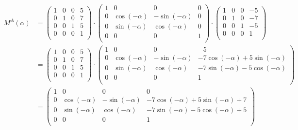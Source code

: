 \documentclass[a4paper,10pt,DIV=14]{article}
\begin{document}
\begin{align*}
M^A(\alpha) & = \begin{pmatrix}
					1 & 0 & 0 & 5 \\
					0 & 1 & 0 & 7 \\
					0 & 0 & 1 & 5 \\
					0 & 0 & 0 & 1 \\
				\end{pmatrix} \cdot
				\begin{pmatrix}
					1 & 0             & 0              & 0 \\
					0 & \cos(-\alpha) & -\sin(-\alpha) & 0 \\
					0 & \sin(-\alpha) & \cos(-\alpha)  & 0 \\
					0 & 0             & 0              & 1 \\
				\end{pmatrix} \cdot
				\begin{pmatrix}
					1 & 0 & 0 & -5 \\
					0 & 1 & 0 & -7 \\
					0 & 0 & 1 & -5 \\
					0 & 0 & 0 & 1  \\
				\end{pmatrix} \\
			& = \begin{pmatrix}
					1 & 0 & 0 & 5 \\
					0 & 1 & 0 & 7 \\
					0 & 0 & 1 & 5 \\
					0 & 0 & 0 & 1 \\
				\end{pmatrix} \cdot
				\begin{pmatrix}
					1 & 0             & 0              & -5                               \\
					0 & \cos(-\alpha) & -\sin(-\alpha) & -7\cos(-\alpha) + 5\sin(-\alpha)  \\
					0 & \sin(-\alpha) & \cos(-\alpha)  & -7\sin(-\alpha) - 5\cos(-\alpha) \\
					0 & 0             & 0              & 1                                \\
				\end{pmatrix} \\
			& = \begin{pmatrix}
					1 & 0             & 0              & 0                                    \\
					0 & \cos(-\alpha) & -\sin(-\alpha) & -7\cos(-\alpha) + 5\sin(-\alpha) + 7  \\
					0 & \sin(-\alpha) & \cos(-\alpha)  & -7\sin(-\alpha) - 5\cos(-\alpha) + 5 \\
					0 & 0             & 0              & 1                                    \\
				\end{pmatrix}
\end{align*}
\end{document}
